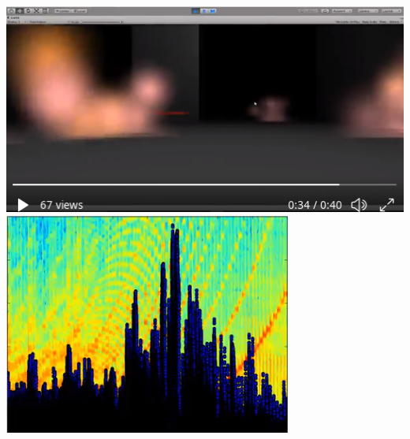 \documentclass[../r.tex]{subfiles}
\begin{document}
\noindent
\href{https://twitter.com/randompast/status/937884584150294528}{\includegraphics[scale=0.445]{../fun/ld40_3hr.png}}
\href{https://twitter.com/randompast/status/1128083994506035200}{\includegraphics[scale=0.425]{../fun/all.png}}
\end{document}
